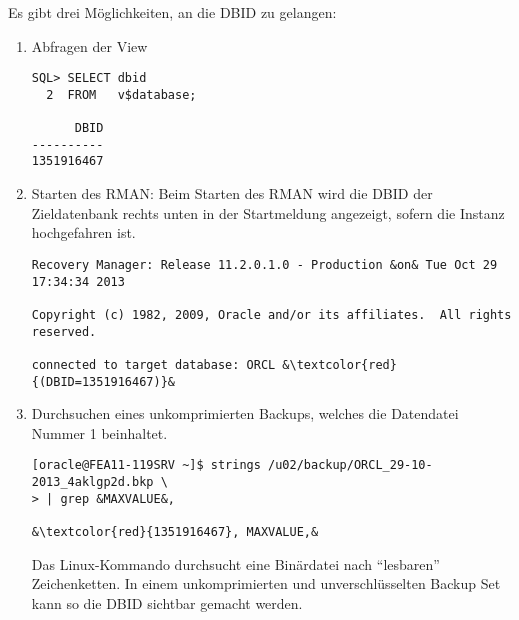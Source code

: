           Es gibt drei Möglichkeiten, an die DBID zu gelangen:
            \begin{enumerate}
              \item Abfragen der View 
                \begin{lstlisting}[caption={Abfragen von \identifier{v\$database}},label=admin1415,language=oracle_sql]
SQL> SELECT dbid
  2  FROM   v$database;

      DBID
----------
1351916467
                \end{lstlisting}
              \item Starten des RMAN: Beim Starten des RMAN wird die DBID der Zieldatenbank rechts unten in der Startmeldung angezeigt, sofern die Instanz hochgefahren ist.
                \begin{lstlisting}[caption={Startmeldung des RMAN},label=admin1416,language=terminal]
Recovery Manager: Release 11.2.0.1.0 - Production &on& Tue Oct 29 17:34:34 2013

Copyright (c) 1982, 2009, Oracle and/or its affiliates.  All rights reserved.

connected to target database: ORCL &\textcolor{red}{(DBID=1351916467)}&
                \end{lstlisting}
              \item Durchsuchen eines unkomprimierten Backups, welches die Datendatei Nummer 1 beinhaltet.
                \begin{lstlisting}[caption={Die DBID in einem Backup Set suchen},label=admin1417,language=terminal]
[oracle@FEA11-119SRV ~]$ strings /u02/backup/ORCL_29-10-2013_4aklgp2d.bkp \
> | grep &MAXVALUE&,

&\textcolor{red}{1351916467}, MAXVALUE,&
                \end{lstlisting}
                Das Linux-Kommando  durchsucht eine Binärdatei nach \enquote{lesbaren} Zeichenketten. In einem unkomprimierten und unverschlüsselten Backup Set kann so die DBID sichtbar gemacht werden.
              \end{enumerate}
